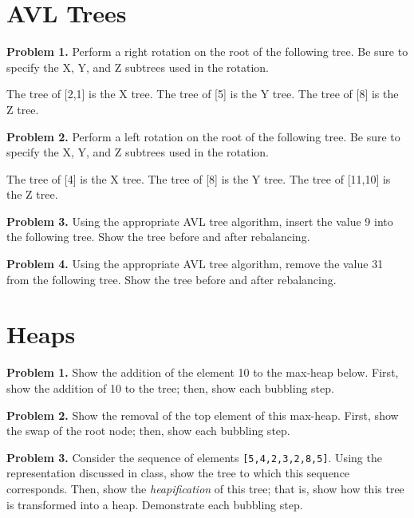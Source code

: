 \documentclass{article}
\begin{document}
\section{AVL Trees}

\noindent \textbf{Problem 1.} Perform a right rotation on the root of the following tree.  Be sure to specify the X, Y, and Z subtrees used in the rotation.


The tree of [2,1] is the X tree. The tree of [5] is the Y tree. The tree of [8] is the Z tree. 

\noindent \textbf{Problem 2.} Perform a left rotation on the root of the following tree.  Be sure to specify the X, Y, and Z subtrees used in the rotation.



The tree of [4] is the X tree. The tree of [8] is the Y tree. The tree of [11,10] is the Z tree. 

\noindent \textbf{Problem 3.} Using the appropriate AVL tree algorithm, insert the value 9 into the following tree.  Show the tree before and after rebalancing.



\noindent \textbf{Problem 4.} Using the appropriate AVL tree algorithm, remove the value 31 from the following tree.  Show the tree before and after rebalancing.



\section{Heaps}

\noindent \textbf{Problem 1.} Show the addition of the element 10 to the max-heap below.  First, show the addition of 10 to the tree; then, show each bubbling step.



\noindent \textbf{Problem 2.} Show the removal of the top element of this max-heap.  First, show the swap of the root node; then, show each bubbling step.



\noindent \textbf{Problem 3.} Consider the sequence of elements \texttt{[5,4,2,3,2,8,5]}.  Using the representation discussed in class, show the tree to which this sequence 
corresponds.  Then, show the \textit{heapification} of this tree; that is, show how this tree is transformed into a heap.  Demonstrate each bubbling step.


\end{document}

